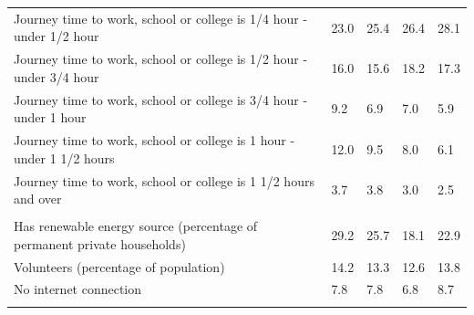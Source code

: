 \documentclass{article}
\begin{document}
\begin{table}[h]
\begin{tabular}{KTTTT}
Journey time to work, school or college is 1/4 hour - under 1/2 hour & 23.0& 25.4& 26.4& 28.1\\
Journey time to work, school or college is 1/2 hour - under 3/4 hour & 16.0& 15.6& 18.2& 17.3\\
Journey time to work, school or college is 3/4 hour - under 1 hour & 9.2& 6.9& 7.0& 5.9\\
Journey time to work, school or college is 1 hour - under 1 1/2 hours & 12.0&  9.5&  8.0&  6.1\\
Journey time to work, school or college is 1 1/2 hours and over & 3.7& 3.8& 3.0& 2.5\\
\hline
    \\ 
    \hline
Has renewable energy source (percentage of permanent private households) & 29.2& 25.7& 18.1& 22.9\\
    \hline
Volunteers (percentage of population) & 14.2& 13.3& 12.6& 13.8\\
    \hline
No internet connection& 7.8& 7.8& 6.8& 8.7\\
\hline
\end{tabular}
\end{table}
\end{document}
